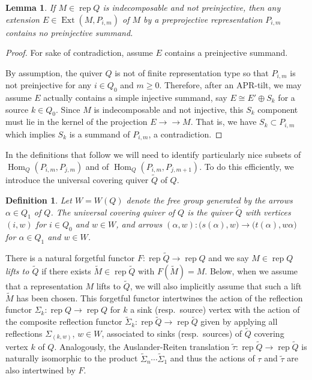 \documentclass{amsart}
\newtheorem{definition}[theorem]{Definition}
\newtheorem{lemma}[theorem]{Lemma}
\numberwithin{equation}{section}
\newcommand{\onto}{\to\!\!\!\!\!\to}
\newcommand{\Ext}{\operatorname{Ext}}
\newcommand{\Hom}{\operatorname{Hom}}
\newcommand{\rep}{\operatorname{rep}}
\begin{document}
\begin{lemma}
  \label{le:nonpreinjective extensions}
  If $M\in\rep Q$ is indecomposable and not preinjective, then any extension $E\in\Ext(M,P_{i,m})$ of $M$ by a preprojective representation $P_{i,m}$ contains no preinjective summand.
\end{lemma}
\begin{proof}
  For sake of contradiction, assume $E$ contains a preinjective summand.

  By assumption, the quiver $Q$ is not of finite representation type so that $P_{i,m}$ is not preinjective for any $i\in Q_0$ and $m\ge0$.
  Therefore, after an APR-tilt, we may assume $E$ actually contains a simple injective summand, say $E\cong E'\oplus S_k$ for a source $k\in Q_0$.
  Since $M$ is indecomposable and not injective, this $S_k$ component must lie in the kernel of the projection $E\onto M$.
  That is, we have $S_k\subset P_{i,m}$ which implies $S_k$ is a summand of $P_{i,m}$, a contradiction.
\end{proof}

In the definitions that follow we will need to identify particularly nice subsets of $\Hom_Q(P_{i,m},P_{j,m})$ and of $\Hom_Q(P_{i,m},P_{j,m+1})$.
To do this efficiently, we introduce the universal covering quiver $\widetilde{Q}$ of $Q$.
\begin{definition}
  Let $W=W(Q)$ denote the free group generated by the arrows $\alpha\in Q_1$ of $Q$.
  The \emph{universal covering quiver} of $Q$ is the quiver $\widetilde{Q}$ with vertices $(i,w)$ for $i\in Q_0$ and $w\in W$, and arrows $(\alpha,w):\big(s(\alpha),w\big)\to \big(t(\alpha),w \alpha \big)$ for $\alpha\in Q_1$ and $w\in W$.
\end{definition}
There is a natural forgetful functor $F:\rep\widetilde{Q}\to\rep Q$ and we say $M\in\rep Q$ \emph{lifts to $\widetilde{Q}$} if there exists $\widetilde{M}\in\rep\widetilde{Q}$ with $F(\widetilde{M})=M$.
Below, when we assume that a representation $M$ lifts to $\widetilde{Q}$, we will also implicitly assume that such a lift $\widetilde{M}$ has been chosen.
This forgetful functor intertwines the action of the reflection functor $\Sigma_k:\rep Q\to\rep Q$ for $k$ a sink (resp.~source) vertex with the action of the composite reflection functor $\widetilde{\Sigma}_k:\rep\widetilde{Q}\to\rep\widetilde{Q}$ given by applying all reflections $\Sigma_{(k,w)}$, $w\in W$, associated to sinks (resp.~sources) of $\widetilde{Q}$ covering vertex $k$ of $Q$.
Analogously, the Auslander-Reiten translation $\tilde\tau:\rep\widetilde{Q}\to\rep\widetilde{Q}$ is naturally isomorphic to the product $\widetilde{\Sigma}_n\cdots\widetilde{\Sigma}_1$ and thus the actions of $\tau$ and $\tilde{\tau}$ are also intertwined by $F$. 
\end{document}
